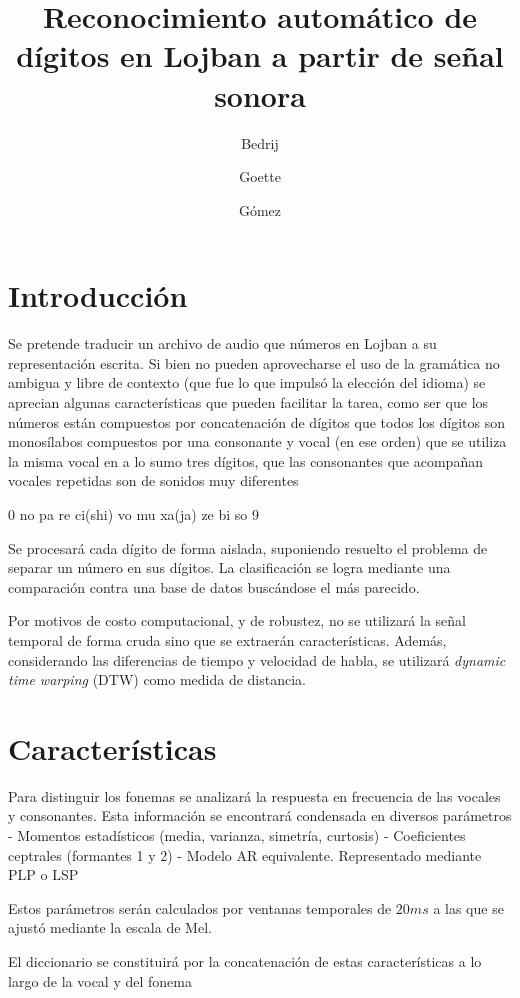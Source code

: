 \documentclass[a4paper]{article}
\title{Reconocimiento automático de dígitos en Lojban a partir de señal sonora}
\author{Bedrij \and Goette \and Gómez}
\date{}
\begin{document}
	\maketitle
	\section{Introducción}
	Se pretende traducir un archivo de audio que números en Lojban
	a su representación escrita.
	Si bien no pueden aprovecharse el uso de la gramática
	no ambigua y libre de contexto (que fue lo que impulsó la
	elección del idioma) se aprecian algunas características que
	pueden facilitar la tarea, como ser que los números están
	compuestos por concatenación de dígitos que todos los dígitos
	son monosílabos compuestos por una consonante y vocal (en ese
	orden) que se utiliza la misma vocal en a lo sumo tres dígitos,
	que las consonantes que acompañan vocales repetidas son de
	sonidos muy diferentes

	0 no pa re ci(shi) vo
	mu xa(ja) ze bi so 9

	Se procesará cada dígito de forma aislada, suponiendo
	resuelto el problema de separar un número en sus dígitos.
	La clasificación se logra mediante una comparación contra una
	base de datos buscándose el más parecido.

	Por motivos de costo computacional, y de robustez, no se
	utilizará la señal temporal de forma cruda sino que se
	extraerán características.  Además, considerando las
	diferencias de tiempo y velocidad de habla, se utilizará
	\emph{dynamic time warping} (DTW) como medida de distancia.

	\section{Características}
		Para distinguir los fonemas se analizará la
		respuesta en frecuencia de las vocales y consonantes.
		Esta información se encontrará condensada en diversos
		parámetros %
			- Momentos estadísticos (media, varianza, simetría, curtosis) 
			- Coeficientes ceptrales (formantes 1 y 2) 
			- Modelo AR equivalente. Representado mediante PLP o LSP

		Estos parámetros serán calculados por ventanas
		temporales de $20ms$ a las que se ajustó mediante la
		escala de Mel.

		El diccionario se constituirá por la concatenación de
		estas características a lo largo de la vocal y del fonema
\end{document}
